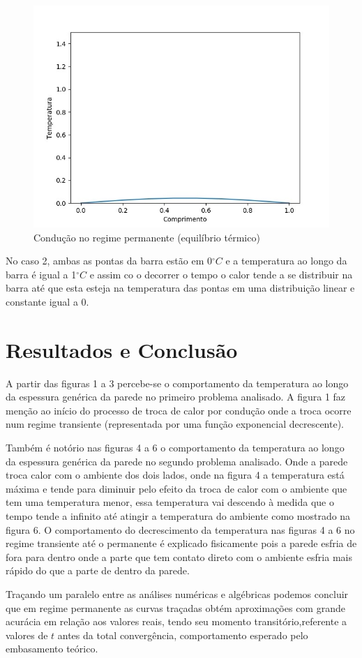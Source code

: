 \documentclass[journal]{IEEEtran}
\begin{document}
		\begin{figure}[H]
			\begin{center}
				\includegraphics[scale=0.3]{res2-3}
				\caption{Condução no regime permanente (equilíbrio térmico)}
			\end{center}
		\end{figure}
		No caso 2, ambas as pontas da barra estão em 0$^{\circ}C$ e a temperatura ao longo da barra é igual a 1$^{\circ}C$ e assim co o decorrer o tempo o calor tende a se distribuir na barra até que esta esteja na temperatura das pontas em uma distribuição linear e constante igual a 0.
        
\section{Resultados e Conclusão}
    A partir das figuras 1 a 3 percebe-se o comportamento da temperatura ao longo da espessura genérica da parede no primeiro problema analisado. A figura 1 faz menção ao início do processo de troca de calor por condução onde a troca ocorre num regime transiente (representada por uma função exponencial decrescente).
    \par Também é notório nas figuras 4 a 6 o comportamento da temperatura ao longo da espessura genérica da parede no segundo problema analisado. Onde a parede troca calor com o ambiente dos dois lados, onde na figura 4 a temperatura está máxima e tende para diminuir pelo efeito da troca de calor com o ambiente que tem uma temperatura menor, essa temperatura vai descendo à medida que o tempo tende a infinito até atingir a temperatura do ambiente como mostrado na figura 6. O comportamento do decrescimento da temperatura nas figuras 4 a 6 no regime transiente até o permanente é explicado fisicamente pois a parede esfria de fora para dentro onde a parte que tem contato direto com o ambiente esfria mais rápido do que a parte de dentro da parede.
	\par Traçando um paralelo entre as análises numéricas e algébricas podemos concluir que em regime permanente as curvas traçadas obtém aproximações com grande acurácia em relação aos valores reais, tendo seu momento transitório,referente a valores de $t$ antes da total convergência, comportamento esperado pelo embasamento teórico. 
    




\end{document}
